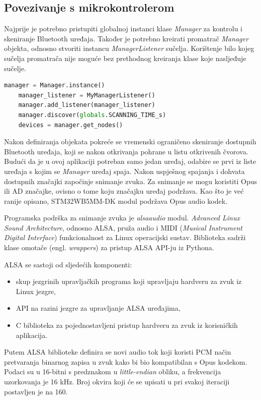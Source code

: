 \subsection{Povezivanje s mikrokontrolerom}

Najprije je potrebno pristupiti globalnoj instanci klase \textit{Manager} za kontrolu i skeniranje Bluetooth uređaja. Također je potrebno kreirati promatrač \textit{Manager} objekta, odnosno stvoriti instancu \textit{ManagerListener} sučelja. Korištenje bilo kojeg sučelja promatrača nije moguće bez prethodnog kreiranja klase koje nasljeđuje sučelje. 

\begin{lstlisting}[language=Python, caption={Pristup \textit{Manager} instanci i skeniranje Bluetooth uređaja}]
	manager = Manager.instance()
	manager_listener = MyManagerListener()
	manager.add_listener(manager_listener)
	manager.discover(globals.SCANNING_TIME_s)
	devices = manager.get_nodes()
\end{lstlisting}

Nakon definiranja objekata pokreće se vremenski ograničeno skeniranje dostupnih Bluetooth uređaja, koji se nakon otkrivanja pohrane u listu otkrivenih čvorova. Budući da je u ovoj aplikaciji potreban samo jedan uređaj, odabire se prvi iz liste uređaja s kojim se \textit{Manager} uređaj spaja. Nakon uspješnog spajanja i dohvata dostupnih značajki započinje snimanje zvuka. Za snimanje se mogu koristiti Opus ili AD značajke, ovisno o tome koju značajku uređaj podržava. Kao što je već ranije opisano, STM32WB5MM-DK modul podržava Opus audio kodek.

Programska podrška za snimanje zvuka je \textit{alsaaudio} modul. \textit{Advanced Linux Sound Architecture}, odnosno ALSA, pruža audio i MIDI (\textit{Musical Instrument Digital Interface}) funkcionalnost za Linux operacijski sustav. Biblioteka sadrži klase omotače (engl. \textit{wrappers}) za pristup ALSA API-ju iz Pythona. 

ALSA se sastoji od sljedećih komponenti:
\begin{itemize}
	\item skup jezgrinih upravljačkih programa koji upravljaju hardveru za zvuk iz Linux jezgre,
	\item API na razini jezgre za upravljanje ALSA uređajima, 
	\item C biblioteka za pojednostavljeni pristup hardveru za zvuk iz korisničkih aplikacija. 
\end{itemize}

Putem ALSA biblioteke definira se novi audio tok koji koristi PCM način pretvaranja binarnog zapisa u zvuk kako bi bio kompatibilan s Opus kodekom. Podaci su u 16-bitni s predznakom u \textit{little-endian} obliku, a frekvencija uzorkovanja je 16 kHz. Broj okvira koji će se upisati u pri svakoj iteraciji postavljen je na 160. 

